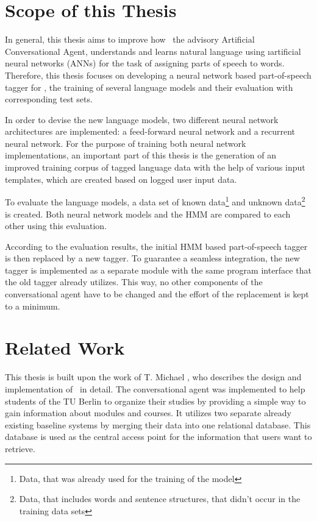 \section{Scope of this Thesis}\label{c.introduction.scope}
In general, this thesis aims to improve how \Alex\, the advisory Artificial Conversational Agent, understands and learns natural language using \i{artificial neural networks} (ANNs) for the task of assigning parts of speech to words. Therefore, this thesis focuses on developing a neural network based part-of-speech tagger for \Alex, the training of several language models and their evaluation with corresponding test sets.

In order to devise the new language models, two different neural network architectures are implemented: a feed-forward neural network and a recurrent neural network. For the purpose of training both neural network implementations, an important part of this thesis is the generation of an improved training corpus of tagged language data with the help of various input templates, which are created based on logged user input data.

To evaluate the language models, a data set of known data\footnote{Data, that was already used for the training of the model} and unknown data\footnote{Data, that includes words and sentence structures, that didn't occur in the training data sets} is created. Both neural network models and the HMM are compared to each other using this evaluation.

According to the evaluation results, the initial HMM based part-of-speech tagger is then replaced by a new tagger. To guarantee a seamless integration, the new tagger is implemented as a separate module with the same program interface that the old tagger already utilizes. This way, no other components of the conversational agent have to be changed and the effort of the replacement is kept to a minimum.

\section{Related Work}\label{c.introduction.related}
This thesis is built upon the work of T. Michael \cite{michael2016}, who describes the design and implementation of \Alex\ in detail. The conversational agent was implemented to help students of the TU Berlin to organize their studies by providing a simple way to gain information about modules and courses. It utilizes two separate already existing baseline systems by merging their data into one relational database. This database is used as the central access point for the information that users want to retrieve.

